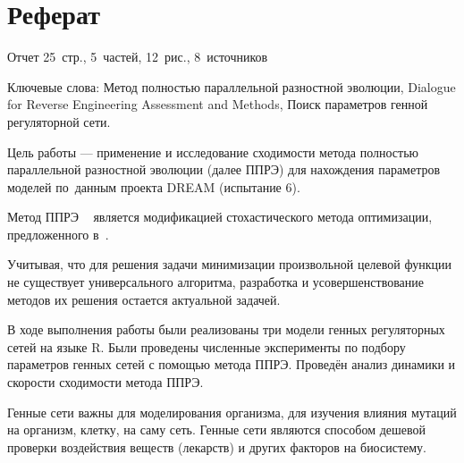 \chapter*{Реферат}							%

Отчет 25~стр., 5~частей, 12~рис., 8~источников

Ключевые слова: Метод полностью параллельной разностной эволюции, Dialogue for 
Reverse Engineering Assessment and Methods, Поиск параметров генной регуляторной 
сети.

Цель работы — применение и исследование сходимости метода полностью параллельной
разностной эволюции (далее ППРЭ) для нахождения параметров моделей по~данным 
проекта DREAM (испытание 6).

Метод ППРЭ ~\cite{bib2,bib5} 
является модификацией стохастического метода оптимизации, предложенного 
в~\cite{bib1}. 

Учитывая, что для решения задачи минимизации произвольной целевой функции 
не существует универсального алгоритма, разработка и усовершенствование 
методов их решения остается актуальной задачей.

В ходе выполнения работы были реализованы три модели генных регуляторных сетей
на языке R. Были проведены численные эксперименты по подбору параметров генных
сетей с помощью метода ППРЭ. Проведён анализ динамики и скорости сходимости 
метода ППРЭ.

Генные сети важны для моделирования организма, для изучения влияния
мутаций на организм, клетку, на саму сеть. Генные сети являются способом дешевой
проверки воздействия веществ (лекарств) и других факторов на биосистему.

\clearpage
